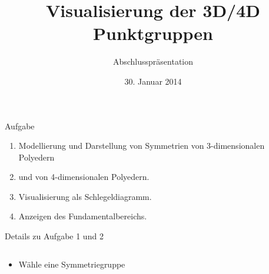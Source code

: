 \documentclass[ucs,11pt]{beamer}
\title[Punktgruppen]{Visualisierung der 3D/4D Punktgruppen}
\subtitle{Abschlusspräsentation}
\institute[FU Berlin]{Freie Universität Berlin}
\date[30.1.2014]{30. Januar 2014}
\begin{document}
\begin{frame}[plain]
	\titlepage
\end{frame}

\begin{frame}{Aufgabe}
	\begin{enumerate}
		\item Modellierung und Darstellung von Symmetrien von 3-dimensionalen Polyedern \pause
		\item und von 4-dimensionalen Polyedern. \pause
		\item Visualisierung als Schlegeldiagramm. \pause
		\item Anzeigen des Fundamentalbereichs.
	\end{enumerate}
\end{frame}


\begin{frame}{Details zu Aufgabe 1 und 2}

\begin{columns}
\begin{column}{.48\textwidth}
\begin{itemize}
	\item Wähle eine Symmetriegruppe	
	\end{itemize}


\end{column}
\end{columns}
\end{frame}
\end{document}
